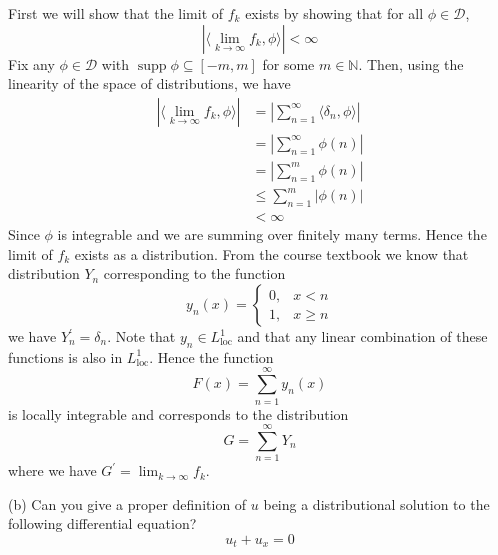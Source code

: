 \documentclass{article}
\DeclareMathOperator\supp{supp}
\begin{document}
First we will show that the limit of $f_k$ exists by showing that for
all $\phi \in \mathcal{D}$,
%
\begin{equation*}
    \left| \langle \lim_{k \to \infty} f_k, \phi \rangle \right| < \infty
\end{equation*}
%
Fix any $\phi \in \mathcal{D}$ with $\supp \phi \subseteq [-m, m]$
for some $m \in \mathbb{N}$. Then, using the linearity of the space of
distributions, we have
%
\begin{align*}
    \left| \langle \lim_{k \to \infty} f_k, \phi \rangle \right|
        &= \left| \sum_{n=1}^\infty \langle \delta_n, \phi \rangle \right| \\
        &= \left| \sum_{n=1}^\infty \phi(n) \right| \\
        &= \left| \sum_{n=1}^m \phi(n) \right| \\
        &\leq \sum_{n=1}^m |\phi(n)| \\
        &< \infty
\end{align*}
%
Since $\phi$ is integrable and we are summing over finitely many terms.
Hence the limit of $f_k$ exists as a distribution. From the course
textbook we know that distribution $Y_n$ corresponding to the function
%
\begin{equation*}
    y_n(x) =
        \begin{cases}
            0, & x < n \\
            1, & x \geq n
        \end{cases}
\end{equation*}
%
we have $Y_n^\prime = \delta_n$. Note that $y_n \in L_{\text{loc}}^1$
and that any linear combination of these functions is also in
$L_{\text{loc}}^1$. Hence the function
%
\begin{equation*}
    F(x) = \sum_{n=1}^\infty y_n(x)
\end{equation*}
%
is locally integrable and corresponds to the distribution
%
\begin{equation*}
    G = \sum_{n=1}^\infty Y_n
\end{equation*}
%
where we have $G^\prime = \lim_{k \to \infty} f_k$.

\vspace{5mm}

(b) Can you give a proper definition of $u$ being a distributional
solution to the following differential equation?
%
\begin{equation}
    u_t + u_x = 0
    \label{eq:q2pb}
\end{equation}
\end{document}
